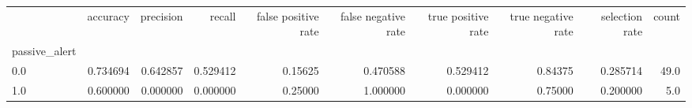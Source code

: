 \begin{tabular}{lrrrrrrrrr}
\toprule
{} &  accuracy &  precision &    recall &  false positive rate &  false negative rate &  true positive rate &  true negative rate &  selection rate &  count \\
passive\_alert &           &            &           &                      &                      &                     &                     &                 &        \\
\midrule
0.0           &  0.734694 &   0.642857 &  0.529412 &              0.15625 &             0.470588 &            0.529412 &             0.84375 &        0.285714 &   49.0 \\
1.0           &  0.600000 &   0.000000 &  0.000000 &              0.25000 &             1.000000 &            0.000000 &             0.75000 &        0.200000 &    5.0 \\
\bottomrule
\end{tabular}
